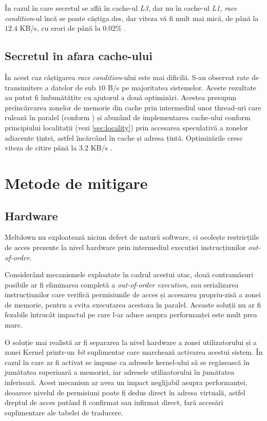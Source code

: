 În cazul în care secretul se află în cache-ul \emph{L3}, dar nu în cache-ul
\emph{L1}, \emph{race condition}-ul încă se poate căștiga des, dar viteza vă fi
mult mai mică, de până la $12.4$ KB/s, cu erori de până la $0.02 \%$
\cite{meltdown2018}.

\subsection{Secretul în afara cache-ului}

În acest caz câștigarea \emph{race condition}-ului este mai dificilă. S-au
observat rate de transimitere a datelor de sub $10$ B/s pe majoritatea
sistemelor. Aceste rezultate au putut fi îmbunătățite cu ajutorul a două
optimizări. Acestea presupun preîncărcarea zonelor de memorie din cache prin
intermediul unor thread-uri care rulează în paralel (conform
\cite{gruss2016prefetch}) și abuzând de implementarea cache-ului conform
principiului localitații (vezi \ref{sec:locality}) prin accesarea speculativă a
zonelor adiacente țintei, astfel încărcând în cache și adresa țintă.
Optimizările cresc viteza de citire până la $3.2$ KB/s \cite{meltdown2018}.

\section{Metode de mitigare}
\label{sec:mitigare_meltdown}

\subsection{Hardware}

Meltdown nu exploatează niciun defect de natură software, ci ocolește
restricțiile de acces prezente la nivel hardware prin intermediul 
execuției instrucțiunilor \emph{out-of-order}.

Considerând mecanismele exploatate în cadrul acestui atac, două contramăsuri
posibile ar fi eliminarea completă a \emph{out-of-order execution}, sau
serializarea instrucțiunilor care verifică permisiunile de acces și accesarea
propriu-zisă a zonei de memorie, pentru a evita executarea acestora în paralel.
Aceaste soluții nu ar fi fezabile întrucât impactul pe care l-ar aduce asupra
performanței este mult prea mare.

O soluție mai realistă ar fi separarea la nivel hardware a zonei utilizatorului
și a zonei Kernel printr-un \emph{bit} suplimentar care marchează activarea
acestui sistem. În cazul în care ar fi activat se impune ca adresele kernel-ului
să se regăsească în jumătatea superioară a memoriei, iar adresele
utilizatorului în jumătatea inferioară. Acest mecanism ar avea un impact
neglijabil asupra performanței, deoarece nivelul de permisiuni poate fi dedus
direct în adresa virtuală, astfel dreptul de acces putând fi confirmat sau
infirmat direct, fară accesări suplimentare ale tabelei de traducere.

